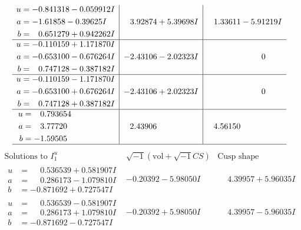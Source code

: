 \documentclass[1p]{elsarticle_modified}
\theoremstyle{definition}
\newcommand{\I}{\sqrt{-1}}
\begin{document}
$$\begin{array}{c|c|c}
\begin{aligned}
u &= -0.841318 - 0.059912 I \\
a &= -1.61858 - 0.39625 I \\
b &= \phantom{-}0.651279 + 0.942262 I\end{aligned}
 & \phantom{-}3.92874 + 5.39698 I & \phantom{-}1.33611 - 5.91219 I \\ \hline\begin{aligned}
u &= -0.110159 + 1.171870 I \\
a &= -0.653100 - 0.676264 I \\
b &= \phantom{-}0.747128 - 0.387182 I\end{aligned}
 & -2.43106 - 2.02323 I & \phantom{-0.000000 } 0 \\ \hline\begin{aligned}
u &= -0.110159 - 1.171870 I \\
a &= -0.653100 + 0.676264 I \\
b &= \phantom{-}0.747128 + 0.387182 I\end{aligned}
 & -2.43106 + 2.02323 I & \phantom{-0.000000 } 0 \\ \hline\begin{aligned}
u &= \phantom{-}0.793654\phantom{ +0.000000I} \\
a &= \phantom{-}3.77720\phantom{ +0.000000I} \\
b &= -1.59505\phantom{ +0.000000I}\end{aligned}
 & \phantom{-}2.43906\phantom{ +0.000000I} & \phantom{-}4.56150\phantom{ +0.000000I}\\
 \hline 
 \end{array}$$\newpage$$\begin{array}{c|c|c}  
\text{Solutions to }I^u_{1}& \I (\text{vol} + \sqrt{-1}CS) & \text{Cusp shape}\\
 \hline 
\begin{aligned}
u &= \phantom{-}0.536539 + 0.581907 I \\
a &= \phantom{-}0.286173 - 1.079810 I \\
b &= -0.871692 + 0.727547 I\end{aligned}
 & -0.20392 - 5.98050 I & \phantom{-}4.39957 + 5.96035 I \\ \hline\begin{aligned}
u &= \phantom{-}0.536539 - 0.581907 I \\
a &= \phantom{-}0.286173 + 1.079810 I \\
b &= -0.871692 - 0.727547 I\end{aligned}
 & -0.20392 + 5.98050 I & \phantom{-}4.39957 - 5.96035 I \\ \hline\begin{aligned}

\end{aligned}
\end{array}$$
\end{document}
